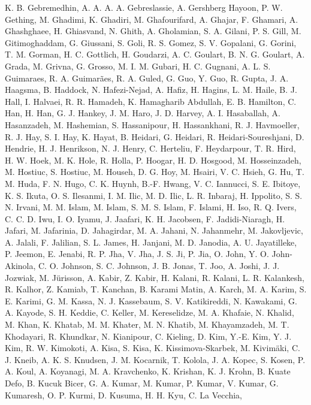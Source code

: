 \documentclass[
  letterpaper,
  DIV=11,
  numbers=noendperiod]{scrartcl}
\newlength{\cslhangindent}
\newenvironment{CSLReferences}[2] %
 {\begin{list}{}{%
  \setlength{\itemindent}{0pt}
  \setlength{\leftmargin}{0pt}
  \setlength{\parsep}{0pt}
  \ifodd #1
   \setlength{\leftmargin}{\cslhangindent}
   \setlength{\itemindent}{-1\cslhangindent}
  \fi
  \setlength{\itemsep}{#2\baselineskip}}}
 {\end{list}}
\begin{document}
\begin{CSLReferences}{0}{0}
{K. B. Gebremedhin, A. A. A. A. Gebreslassie, A. Gershberg Hayoon, P. W.
Gething, M. Ghadimi, K. Ghadiri, M. Ghafourifard, A. Ghajar, F. Ghamari,
A. Ghashghaee, H. Ghiasvand, N. Ghith, A. Gholamian, S. A. Gilani, P. S.
Gill, M. Gitimoghaddam, G. Giussani, S. Goli, R. S. Gomez, S. V.
Gopalani, G. Gorini, T. M. Gorman, H. C. Gottlich, H. Goudarzi, A. C.
Goulart, B. N. G. Goulart, A. Grada, M. Grivna, G. Grosso, M. I. M.
Gubari, H. C. Gugnani, A. L. S. Guimaraes, R. A. Guimarães, R. A. Guled,
G. Guo, Y. Guo, R. Gupta, J. A. Haagsma, B. Haddock, N. Hafezi-Nejad, A.
Hafiz, H. Hagins, L. M. Haile, B. J. Hall, I. Halvaei, R. R. Hamadeh, K.
Hamagharib Abdullah, E. B. Hamilton, C. Han, H. Han, G. J. Hankey, J. M.
Haro, J. D. Harvey, A. I. Hasaballah, A. Hasanzadeh, M. Hashemian, S.
Hassanipour, H. Hassankhani, R. J. Havmoeller, R. J. Hay, S. I. Hay, K.
Hayat, B. Heidari, G. Heidari, R. Heidari-Soureshjani, D. Hendrie, H. J.
Henrikson, N. J. Henry, C. Herteliu, F. Heydarpour, T. R. Hird, H. W.
Hoek, M. K. Hole, R. Holla, P. Hoogar, H. D. Hosgood, M. Hosseinzadeh,
M. Hostiuc, S. Hostiuc, M. Househ, D. G. Hoy, M. Hsairi, V. C. Hsieh, G.
Hu, T. M. Huda, F. N. Hugo, C. K. Huynh, B.-F. Hwang, V. C. Iannucci, S.
E. Ibitoye, K. S. Ikuta, O. S. Ilesanmi, I. M. Ilic, M. D. Ilic, L. R.
Inbaraj, H. Ippolito, S. S. N. Irvani, M. M. Islam, M. Islam, S. M. S.
Islam, F. Islami, H. Iso, R. Q. Ivers, C. C. D. Iwu, I. O. Iyamu, J.
Jaafari, K. H. Jacobsen, F. Jadidi-Niaragh, H. Jafari, M. Jafarinia, D.
Jahagirdar, M. A. Jahani, N. Jahanmehr, M. Jakovljevic, A. Jalali, F.
Jalilian, S. L. James, H. Janjani, M. D. Janodia, A. U. Jayatilleke, P.
Jeemon, E. Jenabi, R. P. Jha, V. Jha, J. S. Ji, P. Jia, O. John, Y. O.
John-Akinola, C. O. Johnson, S. C. Johnson, J. B. Jonas, T. Joo, A.
Joshi, J. J. Jozwiak, M. Jürisson, A. Kabir, Z. Kabir, H. Kalani, R.
Kalani, L. R. Kalankesh, R. Kalhor, Z. Kamiab, T. Kanchan, B. Karami
Matin, A. Karch, M. A. Karim, S. E. Karimi, G. M. Kassa, N. J.
Kassebaum, S. V. Katikireddi, N. Kawakami, G. A. Kayode, S. H. Keddie,
C. Keller, M. Kereselidze, M. A. Khafaie, N. Khalid, M. Khan, K. Khatab,
M. M. Khater, M. N. Khatib, M. Khayamzadeh, M. T. Khodayari, R.
Khundkar, N. Kianipour, C. Kieling, D. Kim, Y.-E. Kim, Y. J. Kim, R. W.
Kimokoti, A. Kisa, S. Kisa, K. Kissimova-Skarbek, M. Kivimäki, C. J.
Kneib, A. K. S. Knudsen, J. M. Kocarnik, T. Kolola, J. A. Kopec, S.
Kosen, P. A. Koul, A. Koyanagi, M. A. Kravchenko, K. Krishan, K. J.
Krohn, B. Kuate Defo, B. Kucuk Bicer, G. A. Kumar, M. Kumar, P. Kumar,
V. Kumar, G. Kumaresh, O. P. Kurmi, D. Kusuma, H. H. Kyu, C. La Vecchia,
}
\end{CSLReferences}
\end{document}
